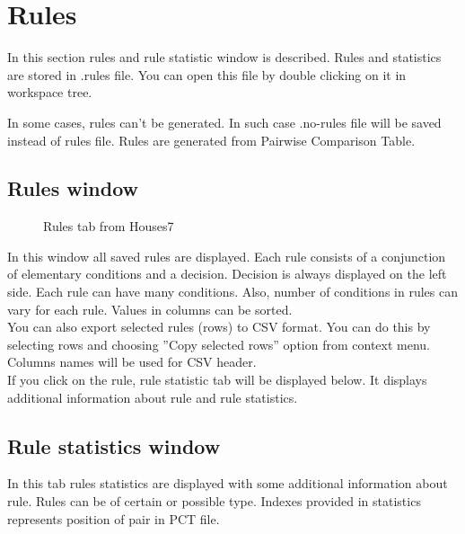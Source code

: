 \section{Rules}\label{section:rules}

In this section rules and rule statistic window is described. Rules and statistics are stored in .rules file. You can open this file by double clicking on it in workspace tree.

In some cases, rules can't be generated. In such case .no-rules file will be saved instead of rules file. Rules are generated from Pairwise Comparison Table.

\subsection{Rules window}\label{sub:rules}

\begin{figure*}[!ht] 
	\centering
	\caption{Rules tab from Houses7}
\end{figure*}

In this window all saved rules are displayed. Each rule consists of a conjunction of elementary conditions and a decision. Decision is always displayed on the left side. Each rule can have many conditions. Also, number of conditions in rules can vary for each rule. Values in columns can be sorted.\\

You can also export selected rules (rows) to CSV format. You can do this by selecting rows and choosing ''Copy selected rows'' option from context menu. Columns names will be used for CSV header.\\

If you click on the rule, rule statistic tab will be displayed below. It displays additional information about rule and rule statistics.

\subsection{Rule statistics window}\label{sub:rule-stat}

In this tab rules statistics are displayed with some additional information about rule.
Rules can be of certain or possible type. Indexes provided in statistics represents position of pair in PCT file.\\

